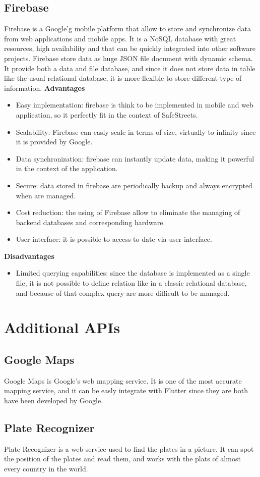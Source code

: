 \documentclass[../ITD.tex]{subfiles}
\begin{document}
    \subsection{Firebase}\label{subsec:firebase}
    Firebase is a Google'g mobile platform that allow to store and synchronize data from web applications and mobile apps.
    It is a NoSQL database with great resources, high availability and that can be quickly integrated into other software projects.
    Firebase store data as huge JSON file document with dynamic schema.
    It provide both a data and file database, and since it does not store data in table like the usual relational database, it is more flexible to store different type of information.
    \newline
    \textbf{Advantages}
    \begin{itemize}
        \item Easy implementation: firebase is think to be implemented in mobile and web application, so it perfectly fit in the context of SafeStreets.
        \item Scalability: Firebase can easly scale in terms of size, virtually to infinity since it is provided by Google.
        \item Data synchronization: firebase can instantly update data, making it powerful in the context of the application.
        \item Secure: data stored in firebase are periodically backup and always encrypted when are managed.
        \item Cost reduction: the using of Firebase allow to eliminate the managing of backend databases and corresponding hardware.
        \item User interface: it is possible to access to date via user interface.
    \end{itemize}
    \textbf{Disadvantages}
    \begin{itemize}
        \item Limited querying capabilities: since the database is implemented as a single file, it is not possible to define relation like in a classic relational database, and because of that complex query are more difficult to be managed.
    \end{itemize}
    \section{Additional APIs}\label{sec:additional-apis}
    \subsection{Google Maps}\label{subsec:google-maps}
    Google Maps is Google's web mapping service.
    It is one of the most accurate mapping service, and it can be easly integrate with Flutter since they are both have been developed by Google.
    \subsection{Plate Recognizer}\label{subsec:plate-recognizer}
    Plate Recognizer is a web service used to find the plates in a picture.
    It can spot the position of the plates and read them, and works with the plats of almost every country in the world.
\end{document}
